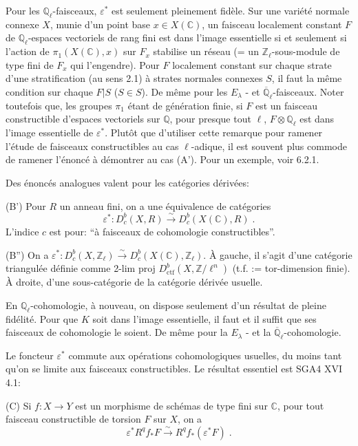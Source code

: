 \documentclass[12pt,a4paper]{article}
\theoremstyle{plain}
\theoremstyle{definition}
\theoremstyle{remark}
\newcommand{\CC}{\mathbb{C}}
\newcommand{\QQ}{\mathbb{Q}}
\newcommand{\ZZ}{\mathbb{Z}}
\begin{document}
Pour les $\QQ_{\ell}$-faisceaux, $\varepsilon^*$ est seulement pleinement fid\`ele. Sur une vari\'et\'e normale connexe $X$, munie d'un point base $x \in X(\CC)$, un faisceau localement constant $F$ de $\QQ_{\ell}$-espaces vectoriels de rang fini est dans l'image essentielle si et seulement si l'action de $\pi_1(X(\CC), x)$ sur $F_x$ stabilise un r\'eseau (= un $\ZZ_{\ell}$-sous-module de type fini de $F_x$ qui l'engendre). Pour $F$ localement constant sur chaque strate d'une stratification (au sens 2.1) \`a strates normales connexes $S$, il faut la m\^eme condition sur chaque $F|S$ ($S \in S$). De m\^eme pour les $E_{\lambda}$ - et $\overline{\QQ}_{\ell}$-faisceaux. Noter toutefois que, les groupes $\pi_1$ \'etant de g\'en\'eration finie, si $F$ est un faisceau constructible d'espaces vectoriels sur $\QQ$, pour presque tout $\ell$, $F \otimes \QQ_{\ell}$ est dans l'image essentielle de $\varepsilon^*$. Plut\^ot que d'utiliser cette remarque pour ramener l'\'etude de faisceaux constructibles au cas $\ell$-adique, il est souvent plus commode de ramener l'\'enonc\'e \`a d\'emontrer au cas (A'). Pour un exemple, voir 6.2.1.

\medskip
Des \'enonc\'es analogues valent pour les cat\'egories d\'eriv\'ees:

\medskip
(B') Pour $R$ un anneau fini, on a une \'equivalence de cat\'egories
\[
\varepsilon^*: D^b_c(X, R) \xrightarrow{\sim} D^b_c(X(\CC), R)\;.
\]
L'indice $c$ est pour: ``\`a faisceaux de cohomologie constructibles''.

\medskip
(B'') On a $\varepsilon^*: D^b_c(X, \ZZ_{\ell}) \xrightarrow{\sim} D^b_c(X(\CC), \ZZ_{\ell})$. \`A gauche, il s'agit d'une cat\'egorie triangul\'ee d\'efinie comme 2-lim proj $D^b_{\text{ctf}}(X, \ZZ/\ell^n)$ (t.f. := tor-dimension finie). \`A droite, d'une sous-cat\'egorie de la cat\'egorie d\'eriv\'ee usuelle.

\medskip
En $\QQ_{\ell}$-cohomologie, \`a nouveau, on dispose seulement d'un r\'esultat de pleine fid\'elit\'e. Pour que $K$ soit dans l'image essentielle, il faut et il suffit que ses faisceaux de cohomologie le soient. De m\^eme pour la $E_{\lambda}$ - et la $\overline{\QQ}_{\ell}$-cohomologie.

\medskip
Le foncteur $\varepsilon^*$ commute aux op\'erations cohomologiques usuelles, du moins tant qu'on se limite aux faisceaux constructibles. Le r\'esultat essentiel est SGA4 XVI 4.1:

\medskip
(C) Si $f: X \to Y$ est un morphisme de sch\'emas de type fini sur $\CC$, pour tout faisceau constructible de torsion $F$ sur $X$, on a
\[
\varepsilon^*R^qf_*F \xrightarrow{\sim} R^qf_{*}(\varepsilon^*F)\;.
\]
\end{document}
